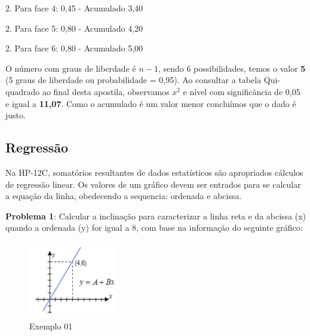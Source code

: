 2. Para face 4: 0,45 - Acumulado 3,40 \\
     \keystroke{$-$}  \keystroke{$\times$}   \keystroke{$\div$} \keystroke{$+$}

2. Para face 5: 0,80 - Acumulado 4,20 \\
     \keystroke{$-$}  \keystroke{$\times$}   \keystroke{$\div$} \keystroke{$+$}

2. Para face 6: 0,80 - Acumulado 5,00 \\
     \keystroke{$-$}  \keystroke{$\times$}   \keystroke{$\div$} \keystroke{$+$}

O número com graus de liberdade é $n - 1$, sendo 6 possibilidades, temos o valor \textbf{5} (5 graus de liberdade ou probabilidade = 0,95). Ao consultar a tabela Qui-quadrado ao final desta apostila, observamos $x^2$ e nível com significância de 0,05 e igual a \textbf{11,07}. Como o acumulado é um valor menor concluímos que o dado é justo.

\subsection*{Regressão}
Na HP-12C, somatórios resultantes de dados estatísticos são apropriados cálculos de regressão linear. Os valores de um gráfico devem ser entrados para se calcular a equação da linha, obedecendo a sequencia: ordenada e abcissa. 

\textbf{Problema 1}: Calcular a inclinação para caracterizar a linha reta e da abcissa (x) quando a ordenada (y) for igual a 8, com base na informação do seguinte gráfico:
\begin{figure}[H]
	\centering
	\includegraphics[width=0.35\textwidth]{images/reta01}
	\caption{Exemplo 01}
\end{figure}

